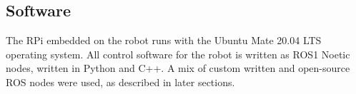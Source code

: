 \subsection{ Software }

The RPi embedded on the robot runs with the Ubuntu Mate 20.04 LTS operating system. All control software for the robot is written as ROS1 Noetic \cite{rosnoetic} nodes, written in Python and C++. A mix of custom written and open-source ROS nodes were used, as described in later sections. 
